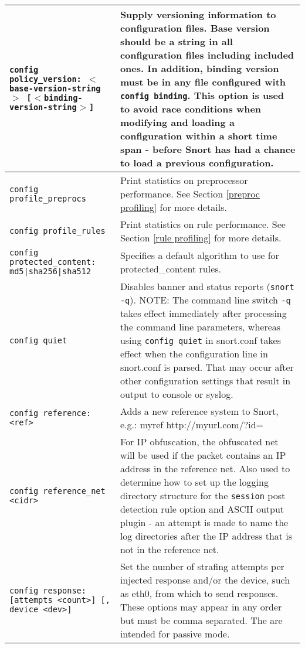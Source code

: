 \documentclass[english]{report}
\begin{document}
\begin{center}
\begin{longtable}[t]{| p{2.5in} | p{3.5in} |}
\hline
\texttt{config policy\_version: $<$base-version-string$>$ [$<$binding-version-string$>$]} &
Supply versioning information to configuration files.  Base version should be
a string in all configuration files including included ones.  In addition,
binding version must be in any file configured with \texttt{config binding}.
This option is used to avoid race conditions when modifying and loading a
configuration within a short time span - before Snort has had a chance to
load a previous configuration. \\

\hline
\texttt{config profile\_preprocs} & Print statistics on preprocessor
performance.  See Section \ref{preproc profiling} for more details. \\


\hline
\texttt{config profile\_rules} & Print statistics on rule performance.  See
Section \ref{rule profiling} for more details. \\

\hline
\texttt{config protected\_content:
md5|sha256|sha512} & Specifies a default algorithm to use for protected\_content rules.  \\

\hline
\texttt{config quiet}& Disables banner and status reports (\texttt{snort -q}).
NOTE: The command line switch \texttt{-q} takes effect immediately after
processing the command line parameters, whereas using \texttt{config quiet}
in snort.conf takes effect when the configuration line in snort.conf is parsed.
That may occur after other configuration settings that result in output to
console or syslog.
\\

\hline
\texttt{config reference: <ref>} & Adds a new reference system to Snort, e.g.:
myref http://myurl.com/?id=\\

\hline
\texttt{config reference\_net <cidr>} & For IP obfuscation, the obfuscated net
will be used if the packet contains an IP address in the reference net.  Also
used to determine how to set up the logging directory structure for the
\texttt{session} post detection rule option and ASCII output plugin - an
attempt is made to name the log directories after the IP address that is not in
the reference net. \\

\hline \texttt{config response: [attempts <count>] [, device <dev>]} & Set the
number of strafing attempts per injected response and/or the device, such as
eth0, from which to send responses.  These options may appear in any order but
must be comma separated.  The are intended for passive mode. \\


\end{longtable}
\end{center}
\end{document}
